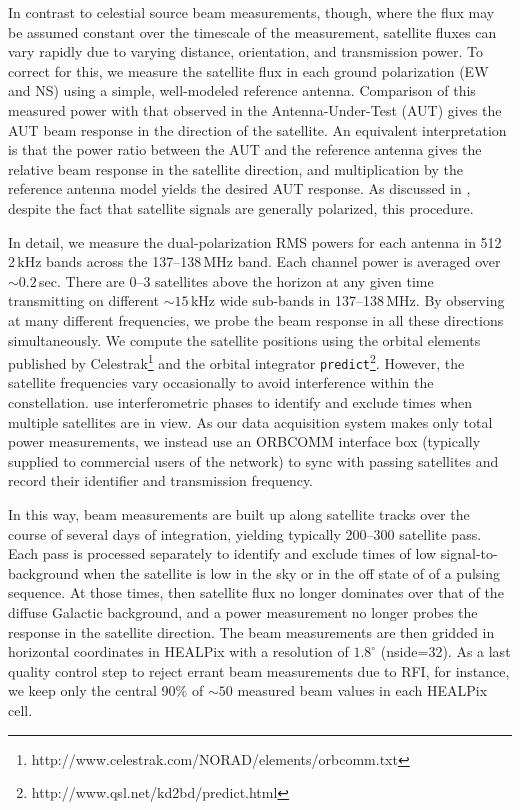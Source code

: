 \documentclass[preprint]{aastex}
\begin{document}
In contrast to celestial source beam measurements, though, where the flux may be assumed constant over the timescale of the measurement, satellite fluxes can vary rapidly due to varying distance, orientation, and transmission power. To correct for this, we measure the satellite flux in each ground polarization (EW and NS) using a simple, well-modeled reference antenna. Comparison of this measured power with that observed in the Antenna-Under-Test (AUT) gives the AUT beam response in the direction of the satellite. An equivalent interpretation is that the power ratio between the AUT and the reference antenna gives the relative beam response in the satellite direction, and multiplication by the reference antenna model yields the desired AUT response. As discussed in \citet{neben15}, despite the fact that satellite signals are generally polarized, this procedure.

In detail, we measure the dual-polarization RMS powers for each antenna in 512 2\,kHz bands across the 137--138\,MHz band. Each channel power is averaged over $\sim0.2$\,sec. There are 0--3 satellites above the horizon at any given time transmitting on different $\sim15$\,kHz wide sub-bands in 137--138\,MHz. By observing at many different frequencies, we probe the beam response in all these directions simultaneously. We compute the satellite positions using the orbital elements published by Celestrak\footnote{http://www.celestrak.com/NORAD/elements/orbcomm.txt} and the orbital integrator \texttt{predict}\footnote{http://www.qsl.net/kd2bd/predict.html}. However, the satellite frequencies vary occasionally to avoid interference within the constellation. \citet{zheng14} use interferometric phases to identify and exclude times when multiple satellites are in view. As our data acquisition system makes only total power measurements, we instead use an ORBCOMM interface box (typically supplied to commercial users of the network) to sync with passing satellites and record their identifier and transmission frequency.

In this way, beam measurements are built up along satellite tracks over the course of several days of integration, yielding typically 200--300 satellite pass. Each pass is processed separately to identify and exclude times of low signal-to-background when the satellite is low in the sky or in the off state of of a pulsing sequence. At those times, then satellite flux no longer dominates over that of the diffuse Galactic background, and a power measurement no longer probes the response in the satellite direction. The beam measurements are then gridded in horizontal coordinates in HEALPix with a resolution of $1.8^\circ$ (nside=32). As a last quality control step to reject errant beam measurements due to RFI, for instance, we keep only the central 90\% of $\sim50$ measured beam values in each HEALPix cell.
\end{document}
